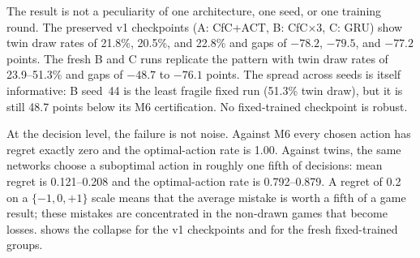 \documentclass[conference]{IEEEtran}
\begin{document}
The result is not a peculiarity of one architecture, one seed, or one training round. The preserved v1 checkpoints (A: CfC+ACT, B: CfC$\times$3, C: GRU) show twin draw rates of 21.8\%, 20.5\%, and 22.8\% and gaps of $-78.2$, $-79.5$, and $-77.2$ points. The fresh B and C runs replicate the pattern with twin draw rates of 23.9--51.3\% and gaps of $-48.7$ to $-76.1$ points. The spread across seeds is itself informative: B seed~44 is the least fragile fixed run (51.3\% twin draw), but it is still 48.7 points below its M6 certification. No fixed-trained checkpoint is robust.

At the decision level, the failure is not noise. Against M6 every chosen action has regret exactly zero and the optimal-action rate is 1.00. Against twins, the same networks choose a suboptimal action in roughly one fifth of decisions: mean regret is 0.121--0.208 and the optimal-action rate is 0.792--0.879. A regret of 0.2 on a $\{-1,0,+1\}$ scale means that the average mistake is worth a fifth of a game result; these mistakes are concentrated in the non-drawn games that become losses.  shows the collapse for the v1 checkpoints and for the fresh fixed-trained groups.
\end{document}
